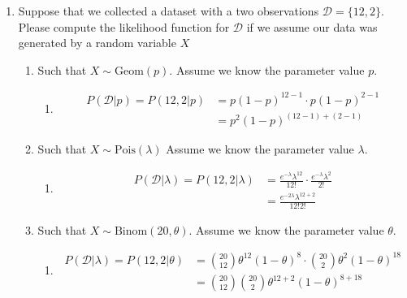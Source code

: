 \documentclass[krantz1,ChapterTOCs]{krantz}
\begin{document}
\begin{enumerate}
    \item Suppose that we collected a dataset with a two observations $\mathcal{D} = \{ 12, 2 \}$. Please compute the likelihood function for $\mathcal{D}$ if we assume our data was generated by a random variable $X$
        \begin{enumerate}
        \item Such that $X \sim \text{Geom}(p)$. Assume we know the parameter value $p$.
        
        \begin{enumerate}
            \item {\color{red} 
                \begin{align*}
                    P(\mathcal{D} | p) = P(12, 2 | p) &=  p (1-p)^{12-1} \cdot  p (1-p)^{2-1} \\ 
                    &= p^{2} (1-p)^{(12-1) + (2-1)}
                \end{align*}
            }
        \end{enumerate}
        
        \item Such that $X \sim \text{Pois}(\lambda)$ Assume we know the parameter value $\lambda$. 
        
        \begin{enumerate}
            \item {\color{red} 
                \begin{align*}
                    P(\mathcal{D} | \lambda) = P(12, 2 | \lambda) &=  \frac{e^{-\lambda} \lambda^{12}}{12!} \cdot  \frac{e^{-\lambda} \lambda^{2}}{2!} \\ 
                    &= \frac{ e^{-2\lambda} \lambda^{12 + 2} }{12! 2!}
                \end{align*}
            }
        \end{enumerate}
        
        \item Such that $X \sim \text{Binom}(20, \theta)$.
        Assume we know the parameter value $\theta$.
        
        \begin{enumerate}
            \item {\color{red} 
                \begin{align*}
                    P(\mathcal{D} | \lambda) = P(12, 2 | \theta) &= \binom{20}{12}\theta^{12}(1-\theta)^{8} \cdot  \binom{20}{2}\theta^{2}(1-\theta)^{18}\\
                    &= \binom{20}{12} \binom{20}{2} \theta^{12+2} (1-\theta)^{ 8+18}
                \end{align*}
            }
        \end{enumerate}
        

\end{enumerate}
\end{enumerate}
\end{document}
